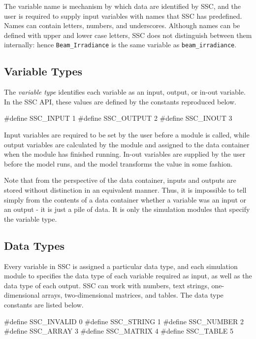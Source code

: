 \documentclass{article}
\begin{document}
The variable name is mechanism by which data are identified by SSC, and the user is required to supply input variables with names that SSC has predefined.  Names can contain letters, numbers, and underscores.  Although names can be defined with upper and lower case letters, SSC does not distinguish between them internally: hence \texttt{Beam\_Irradiance} is the same variable as \texttt{beam\_irradiance}.

\subsection{Variable Types}

The \emph{variable type} identifies each variable as an input, output, or in-out variable.  In the SSC API, these values are defined by the constants reproduced below.

\begin{verbatimtab}
#define SSC_INPUT 1
#define SSC_OUTPUT 2
#define SSC_INOUT 3
\end{verbatimtab}

Input variables are required to be set by the user before a module is called, while output variables are calculated by the module and assigned to the data container when the module has finished running.  In-out variables are supplied by the user before the model runs, and the model transforms the value in some fashion.

Note that from the perspective of the data container, inputs and outputs are stored without distinction in an equivalent manner.  Thus, it is impossible to tell simply from the contents of a data container whether a variable was an input or an output - it is just a pile of data.  It is only the simulation modules that specify the variable type.

\subsection{Data Types}

Every variable in SSC is assigned a particular data type, and each simulation module to specifies the data type of each variable required as input, as well as the data type of each output.  SSC can work with numbers, text strings, one-dimensional arrays, two-dimensional matrices, and tables.  The data type constants are listed below.

\begin{verbatimtab}
#define SSC_INVALID 0
#define SSC_STRING 1
#define SSC_NUMBER 2
#define SSC_ARRAY 3
#define SSC_MATRIX 4
#define SSC_TABLE 5
\end{verbatimtab}
\end{document}
